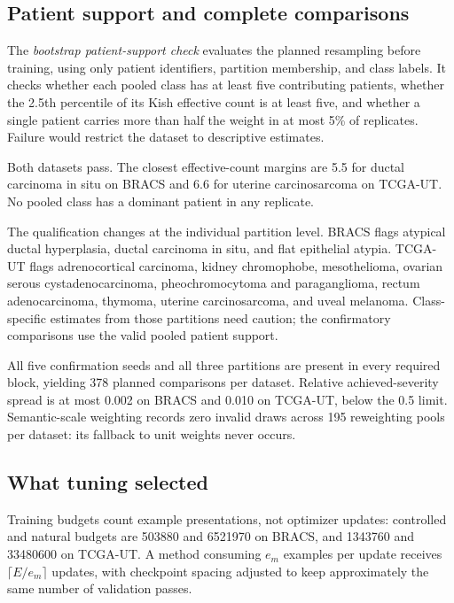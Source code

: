 \subsection{Patient support and complete comparisons}
\label{app:realized-validity}
The \emph{bootstrap patient-support check} evaluates the planned resampling before training, using only patient identifiers, partition membership, and class labels. It checks whether each pooled class has at least five contributing patients, whether the \num{2.5}th percentile of its Kish effective count is at least five, and whether a single patient carries more than half the weight in at most \num{5}\% of replicates. Failure would restrict the dataset to descriptive estimates.

Both datasets pass. The closest effective-count margins are \num{5.5} for ductal carcinoma in situ on BRACS and \num{6.6} for uterine carcinosarcoma on TCGA-UT. No pooled class has a dominant patient in any replicate.

The qualification changes at the individual partition level. BRACS flags atypical ductal hyperplasia, ductal carcinoma in situ, and flat epithelial atypia. TCGA-UT flags adrenocortical carcinoma, kidney chromophobe, mesothelioma, ovarian serous cystadenocarcinoma, pheochromocytoma and paraganglioma, rectum adenocarcinoma, thymoma, uterine carcinosarcoma, and uveal melanoma. Class-specific estimates from those partitions need caution; the confirmatory comparisons use the valid pooled patient support.

All five confirmation seeds and all three partitions are present in every required block, yielding \num{378} planned comparisons per dataset. Relative achieved-severity spread is at most \num{0.002} on BRACS and \num{0.010} on TCGA-UT, below the \num{0.5} limit. Semantic-scale weighting records zero invalid draws across \num{195} reweighting pools per dataset: its fallback to unit weights never occurs.

\subsection{What tuning selected}
\label{app:realized-tuning}
Training budgets count example presentations, not optimizer updates: controlled and natural budgets are \num{503880} and \num{6521970} on BRACS, and \num{1343760} and \num{33480600} on TCGA-UT. A method consuming $e_m$ examples per update receives $\lceil E/e_m\rceil$ updates, with checkpoint spacing adjusted to keep approximately the same number of validation passes.


